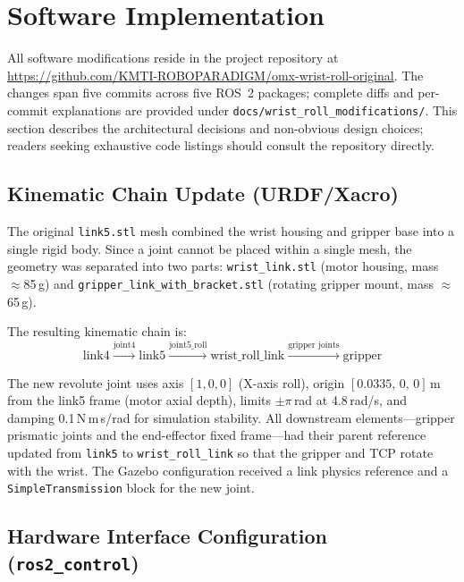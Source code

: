 \documentclass[conference]{IEEEtran}
\begin{document}
	
	\section{Software Implementation}
	\label{sec:software}
	
	All software modifications reside in the project repository at
	\url{https://github.com/KMTI-ROBOPARADIGM/omx-wrist-roll-original}.
	The changes span five commits across five ROS~2 packages; complete
	diffs and per-commit explanations are provided under
	\texttt{docs/wrist\_roll\_modifications/}. This section describes the
	architectural decisions and non-obvious design choices; readers seeking
	exhaustive code listings should consult the repository directly.
	
	\subsection{Kinematic Chain Update (URDF/Xacro)}
	
	The original \texttt{link5.stl} mesh combined the wrist housing and
	gripper base into a single rigid body. Since a joint cannot be placed
	within a single mesh, the geometry was separated into two parts:
	\texttt{wrist\_link.stl} (motor housing, mass $\approx$85\,g) and
	\texttt{gripper\_link\_with\_bracket.stl} (rotating gripper mount,
	mass $\approx$65\,g).
	
	The resulting kinematic chain is:
	\begin{equation*}
		\text{link4}
		\xrightarrow{\text{joint4}}
		\text{link5}
		\xrightarrow{\text{joint5\_roll}}
		\text{wrist\_roll\_link}
		\xrightarrow{\text{gripper joints}}
		\text{gripper}
	\end{equation*}
	
	The new revolute joint uses axis $[1,0,0]$ (X-axis roll), origin
	$[0.0335,\,0,\,0]$\,m from the link5 frame (motor axial depth),
	limits $\pm\pi$\,rad at 4.8\,rad/s, and damping 0.1\,N\,m\,s/rad for
	simulation stability. All downstream elements---gripper prismatic
	joints and the end-effector fixed frame---had their parent reference
	updated from \texttt{link5} to \texttt{wrist\_roll\_link} so that the
	gripper and TCP rotate with the wrist. The Gazebo configuration
	received a link physics reference and a \texttt{SimpleTransmission}
	block for the new joint.
	
	\subsection{Hardware Interface Configuration (\texttt{ros2\_control})}
	
\end{document}
